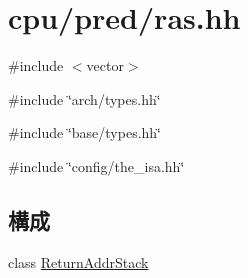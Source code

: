 \hypertarget{ras_8hh}{
\section{cpu/pred/ras.hh}
\label{ras_8hh}
}
{\ttfamily \#include $<$vector$>$}\par
{\ttfamily \#include \char`\"{}arch/types.hh\char`\"{}}\par
{\ttfamily \#include \char`\"{}base/types.hh\char`\"{}}\par
{\ttfamily \#include \char`\"{}config/the\_\-isa.hh\char`\"{}}\par
\subsection*{構成}
\begin{DoxyCompactItemize}
\item 
class \hyperlink{classReturnAddrStack}{ReturnAddrStack}
\end{DoxyCompactItemize}
